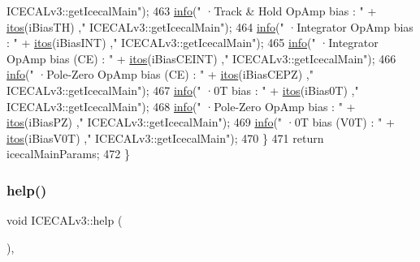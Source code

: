 \begin{DoxyCode}
{      ICECALv3::getIcecalMain"});
463         \hyperlink{classObject_a644fd329ea4cb85f54fa6846484b84a8}{info}(\textcolor{stringliteral}{"   ·Track & Hold OpAmp bias          : "} + \hyperlink{Tools_8h_af330027dbdafb9a30768b3613c553e60}{itos}(iBiasTH)          ,\textcolor{stringliteral}{"
      ICECALv3::getIcecalMain"});
464         \hyperlink{classObject_a644fd329ea4cb85f54fa6846484b84a8}{info}(\textcolor{stringliteral}{"   ·Integrator OpAmp bias            : "} + \hyperlink{Tools_8h_af330027dbdafb9a30768b3613c553e60}{itos}(iBiasINT)         ,\textcolor{stringliteral}{"
      ICECALv3::getIcecalMain"});
465         \hyperlink{classObject_a644fd329ea4cb85f54fa6846484b84a8}{info}(\textcolor{stringliteral}{"   ·Integrator OpAmp bias (CE)       : "} + \hyperlink{Tools_8h_af330027dbdafb9a30768b3613c553e60}{itos}(iBiasCEINT)       ,\textcolor{stringliteral}{"
      ICECALv3::getIcecalMain"});
466         \hyperlink{classObject_a644fd329ea4cb85f54fa6846484b84a8}{info}(\textcolor{stringliteral}{"   ·Pole-Zero OpAmp bias (CE)        : "} + \hyperlink{Tools_8h_af330027dbdafb9a30768b3613c553e60}{itos}(iBiasCEPZ)        ,\textcolor{stringliteral}{"
      ICECALv3::getIcecalMain"});
467         \hyperlink{classObject_a644fd329ea4cb85f54fa6846484b84a8}{info}(\textcolor{stringliteral}{"   ·0T bias                    : "} + \hyperlink{Tools_8h_af330027dbdafb9a30768b3613c553e60}{itos}(iBias0T)            ,\textcolor{stringliteral}{"
      ICECALv3::getIcecalMain"});
468         \hyperlink{classObject_a644fd329ea4cb85f54fa6846484b84a8}{info}(\textcolor{stringliteral}{"   ·Pole-Zero OpAmp bias             : "} + \hyperlink{Tools_8h_af330027dbdafb9a30768b3613c553e60}{itos}(iBiasPZ)          ,\textcolor{stringliteral}{"
      ICECALv3::getIcecalMain"});
469         \hyperlink{classObject_a644fd329ea4cb85f54fa6846484b84a8}{info}(\textcolor{stringliteral}{"   ·0T bias (V0T)              : "} + \hyperlink{Tools_8h_af330027dbdafb9a30768b3613c553e60}{itos}(iBiasV0T)           ,\textcolor{stringliteral}{"
      ICECALv3::getIcecalMain"});
470     \}
471     \textcolor{keywordflow}{return} icecalMainParams;
472 \}
\end{DoxyCode}
\mbox{\label{classICECALv3_a00e572849b4952e7cf04a39f992df037}} 
\subsubsection{\texorpdfstring{help()}{help()}}
{\footnotesize\ttfamily void I\+C\+E\+C\+A\+Lv3\+::help (\begin{DoxyParamCaption}{ }\end{DoxyParamCaption})\hspace{0.3cm}{\ttfamily [inline]}, {\ttfamily [virtual]}}

